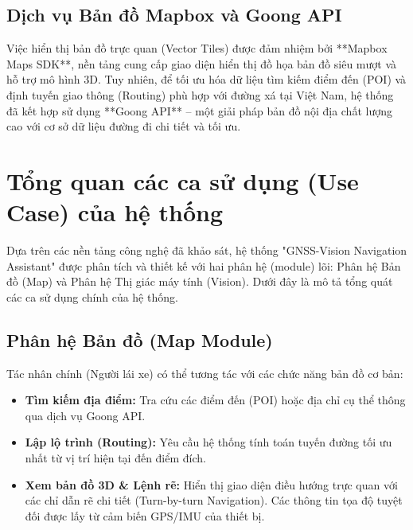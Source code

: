 \documentclass[../DoAn.tex]{subfiles}
\begin{document}
\subsection{Dịch vụ Bản đồ Mapbox và Goong API}
Việc hiển thị bản đồ trực quan (Vector Tiles) được đảm nhiệm bởi **Mapbox Maps SDK**, nền tảng cung cấp giao diện hiển thị đồ họa bản đồ siêu mượt và hỗ trợ mô hình 3D. Tuy nhiên, để tối ưu hóa dữ liệu tìm kiếm điểm đến (POI) và định tuyến giao thông (Routing) phù hợp với đường xá tại Việt Nam, hệ thống đã kết hợp sử dụng **Goong API** – một giải pháp bản đồ nội địa chất lượng cao với cơ sở dữ liệu đường đi chi tiết và tối ưu.

\section{Tổng quan các ca sử dụng (Use Case) của hệ thống}
\label{section:2.6}

Dựa trên các nền tảng công nghệ đã khảo sát, hệ thống "GNSS-Vision Navigation Assistant" được phân tích và thiết kế với hai phân hệ (module) lõi: Phân hệ Bản đồ (Map) và Phân hệ Thị giác máy tính (Vision). Dưới đây là mô tả tổng quát các ca sử dụng chính của hệ thống.

\subsection{Phân hệ Bản đồ (Map Module)}
Tác nhân chính (Người lái xe) có thể tương tác với các chức năng bản đồ cơ bản:
\begin{itemize}
    \item \textbf{Tìm kiếm địa điểm:} Tra cứu các điểm đến (POI) hoặc địa chỉ cụ thể thông qua dịch vụ Goong API.
    \item \textbf{Lập lộ trình (Routing):} Yêu cầu hệ thống tính toán tuyến đường tối ưu nhất từ vị trí hiện tại đến điểm đích.
    \item \textbf{Xem bản đồ 3D \& Lệnh rẽ:} Hiển thị giao diện điều hướng trực quan với các chỉ dẫn rẽ chi tiết (Turn-by-turn Navigation). Các thông tin tọa độ tuyệt đối được lấy từ cảm biến GPS/IMU của thiết bị.
\end{itemize}
\end{document}
